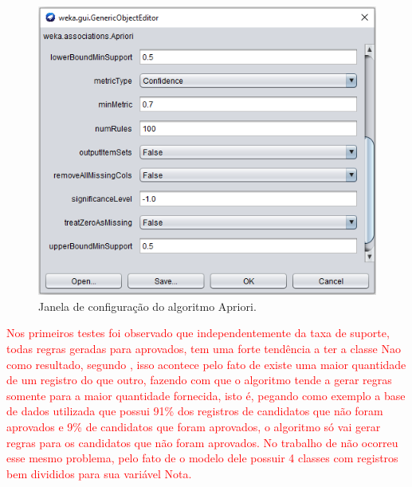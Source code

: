 \par
\begin{figure}[!htp]
	\begin{center}
    \caption{\label{fig:waveform_fig} Janela de configuração do algoritmo Apriori.}
	\includegraphics[scale=0.70]{Figuras/Janela_configuracao_apriori.png}
	\end{center}
\end{figure}


\par
\textcolor{red}{Nos primeiros testes foi observado que independentemente da taxa de suporte, todas regras geradas para aprovados, tem uma forte tendência a ter a classe Nao como resultado, segundo , isso acontece pelo fato de existe uma maior quantidade de um registro do que outro, fazendo com que o algoritmo tende a gerar regras somente para a maior quantidade fornecida, isto é, pegando como exemplo a base de dados utilizada que possui  91\% dos registros de candidatos que não foram aprovados e 9\% de candidatos que foram aprovados, o algoritmo só vai gerar regras para os candidatos que não foram aprovados. No trabalho de  não ocorreu esse mesmo problema, pelo fato de o modelo dele possuir 4 classes com registros bem divididos para sua variável Nota.}


